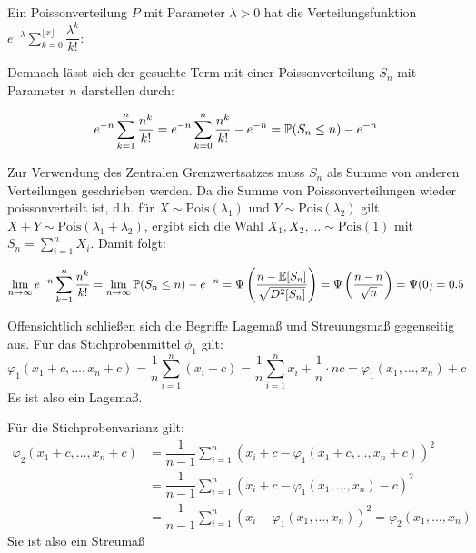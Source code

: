 \begin{loesung}
Ein Poissonverteilung $P$ mit Parameter $\lambda>0$ hat die Verteilungsfunktion 
$e^{-\lambda}\sum_{k=0}^{\lfloor x\rfloor} \dfrac{{\lambda^k}}{k!}$:

Demnach lässt sich der gesuchte Term mit einer Poissonverteilung $S_n$ mit Parameter $n$ darstellen durch:

\[
    e^{-n}\sum_{k=1}^{n} \dfrac{{n^k}}{k!} = e^{-n}\sum_{k=0}^{n} \dfrac{{n^k}}{k!} - e^{-n} = \P(S_n\leq n) - e^{-n}
\]

Zur Verwendung des Zentralen Grenzwertsatzes muss $S_n$ als Summe von anderen Verteilungen geschrieben werden. 
Da die Summe von Poissonverteilungen wieder poissonverteilt ist, 
d.h. für $X\sim\mathrm{Pois}(\lambda_1)$ und $Y\sim\mathrm{Pois}(\lambda_2)$ 
gilt $X+Y\sim\mathrm{Pois}(\lambda_1+\lambda_2)$,
ergibt sich die Wahl $X_1,X_2,\dots\sim\mathrm{Pois}(1)$ mit $S_n=\sum_{i=1}^{n} X_i$.
Damit folgt:

\[
    \lim_{n\to\infty} e^{-n}\sum_{k=1}^{n} \dfrac{{n^k}}{k!} 
    = \lim_{n\to\infty} \P(S_n\leq n) - e^{-n} 
    = \Psi\left(\dfrac{n-\E[S_n]}{\sqrt{D^2[S_n]}}\right) = \Psi\left(\dfrac{n-n}{\sqrt{n}}\right)= \Psi(0) = 0.5
\]
\end{loesung}


\begin{loesung}
    Offensichtlich schließen sich die Begriffe Lagemaß und Streuungsmaß gegenseitig aus.
    Für das Stichprobenmittel $\phi_1$ gilt:
    \[
        \varphi_1(x_1+c,\dots,x_n+c) 
        = \dfrac{1}{n}\sum_{i=1}^{n}(x_i+c) 
        = \dfrac{1}{n} \sum_{i=1}^{n}x_i + \dfrac{1}{n}\cdot nc 
        = \varphi_1(x_1,\dots,x_n) + c
    \]
    Es ist also ein Lagemaß.

    Für die Stichprobenvarianz gilt:
    \begin{align*}
        \varphi_2(x_1+c,\dots,x_n+c) 
        &= \dfrac{1}{n-1}\sum_{i=1}^{n}(x_i+c-\varphi_1(x_1+c,\dots,x_n+c))^2\\
        &= \dfrac{1}{n-1}\sum_{i=1}^{n}(x_i+c-\varphi_1(x_1,\dots,x_n)-c)^2\\
        &= \dfrac{1}{n-1}\sum_{i=1}^{n}(x_i-\varphi_1(x_1,\dots,x_n))^2
        = \varphi_2(x_1,\dots,x_n) 
    \end{align*}
    Sie ist also ein Streumaß
\end{loesung}

